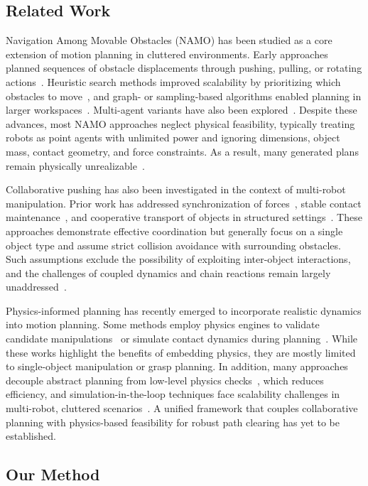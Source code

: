 \subsection{Related Work}\label{subsec:intro-related}

Navigation Among Movable Obstacles (NAMO) has been studied as a core
extension of motion planning in cluttered environments. Early approaches
planned sequences of obstacle displacements through pushing, pulling, or
rotating actions~\cite{}. Heuristic search methods improved scalability
by prioritizing which obstacles to move~\cite{}, and graph- or
sampling-based algorithms enabled planning in larger workspaces~\cite{}.
Multi-agent variants have also been explored~\cite{}. Despite these
advances, most NAMO approaches neglect physical feasibility, typically
treating robots as point agents with unlimited power and ignoring
dimensions, object mass, contact geometry, and force constraints. As a
result, many generated plans remain physically unrealizable~\cite{}.

Collaborative pushing has also been investigated in the context of
multi-robot manipulation. Prior work has addressed synchronization of
forces~\cite{}, stable contact maintenance~\cite{}, and cooperative
transport of objects in structured settings~\cite{}. These approaches
demonstrate effective coordination but generally focus on a single object
type and assume strict collision avoidance with surrounding obstacles.
Such assumptions exclude the possibility of exploiting inter-object
interactions, and the challenges of coupled dynamics and chain reactions
remain largely unaddressed~\cite{}.

Physics-informed planning has recently emerged to incorporate realistic
dynamics into motion planning. Some methods employ physics engines to
validate candidate manipulations~\cite{} or simulate contact dynamics
during planning~\cite{}. While these works highlight the benefits of
embedding physics, they are mostly limited to single-object manipulation
or grasp planning. In addition, many approaches decouple abstract
planning from low-level physics checks~\cite{}, which reduces efficiency,
and simulation-in-the-loop techniques face scalability challenges in
multi-robot, cluttered scenarios~\cite{}. A unified framework that
couples collaborative planning with physics-based feasibility for robust
path clearing has yet to be established.

\subsection{Our Method}\label{subsec:intro-our}

